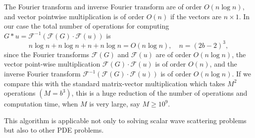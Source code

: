 \documentclass[12pt]{elsarticle}
\numberwithin{equation}{section}
\newcommand{\be}{\begin{equation}}
\newcommand{\ee}{\end{equation}}
\begin{document}
The Fourier transform and inverse Fourier transform are of order $O(n\log n)$, and vector pointwise multiplication is of order $O(n)$ if the vectors are $n \times 1$. In our case the total number of operations for computing $G*u=\mathcal{F}^{-1}(\mathcal{F}(G)\cdot \mathcal{F}(u))$ is
\be \label{eq3.3.9}
	n\log n+n\log n+n+n\log n=O(n\log n), \quad n=(2b-2)^3,
\ee
since the Fourier transforms $\mathcal{F}(G)$ and $\mathcal{F}(u)$ are of order $O(n\log n)$, the vector point-wise multiplication  $\mathcal{F}(G)\cdot \mathcal{F}(u)$ is of order $O(n)$, and the inverse Fourier transform $\mathcal{F}^{-1}(\mathcal{F}(G)\cdot \mathcal{F}(u))$ is of order $O(n\log n)$.
If we compare this with the standard matrix-vector multiplication which takes $M^2$ operations $(M=b^3)$, this is a huge reduction of the number of operations and computation time, when $M$ is very large, say $M \ge 10^{9}$.

This algorithm is applicable not only to solving scalar wave scattering problems but also to other PDE problems.
\end{document}
